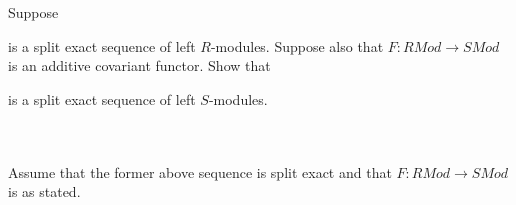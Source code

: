 Suppose

\begin{center}
\end{center}

is a split exact sequence of left $R$-modules. Suppose also that $F:RMod\to SMod$ is an additive
covariant functor. Show that

\begin{center}
\end{center}

is a split exact sequence of left $S$-modules.\\\\

\begin{solution}\renewcommand{\qedsymbol}{}\ \\
    Assume that the former above sequence is split exact and that $F:RMod\to SMod$ is as stated.
\end{solution}